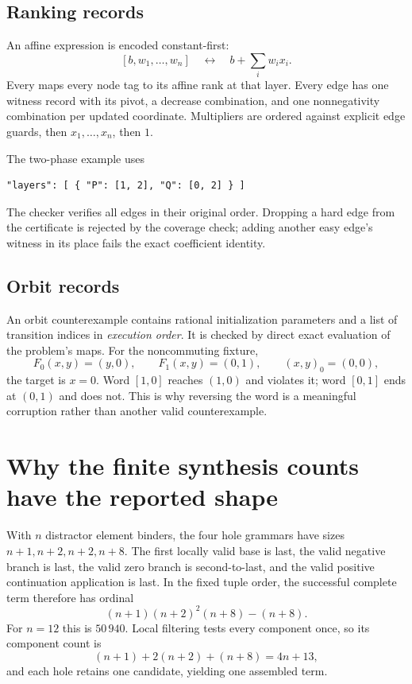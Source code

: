 \subsection{Ranking records}

An affine expression is encoded constant-first:
\[
 [b,w_1,\ldots,w_n]\quad\longleftrightarrow\quad b+\sum_iw_ix_i.
\]
Every  maps every node tag to its affine rank at that layer.
Every edge has one witness record with its pivot, a decrease combination, and
one nonnegativity combination per updated coordinate. Multipliers are ordered
against explicit edge guards, then $x_1,\ldots,x_n$, then $1$.

The two-phase example uses
\begin{lstlisting}
"layers": [ { "P": [1, 2], "Q": [0, 2] } ]
\end{lstlisting}
The checker verifies all edges in their original order. Dropping a hard edge
from the certificate is rejected by the coverage check; adding another easy
edge's witness in its place fails the exact coefficient identity.

\subsection{Orbit records}

An orbit counterexample contains rational initialization parameters and a list
of transition indices in \emph{execution order}. It is checked by direct exact
evaluation of the problem's maps. For the noncommuting fixture,
\[
 F_0(x,y)=(y,0),\qquad F_1(x,y)=(0,1),\qquad (x,y)_0=(0,0),
\]
the target is $x=0$. Word $[1,0]$ reaches $(1,0)$ and violates it; word $[0,1]$
ends at $(0,1)$ and does not. This is why reversing the word is a meaningful
corruption rather than another valid counterexample.

\section{Why the finite synthesis counts have the reported shape}

With $n$ distractor element binders, the four hole grammars have sizes
$n+1,n+2,n+2,n+8$. The first locally valid base is last, the valid negative
branch is last, the valid zero branch is second-to-last, and the valid positive
continuation application is last. In the fixed tuple order, the successful
complete term therefore has ordinal
\[
 (n+1)(n+2)^2(n+8)-(n+8).
\]
For $n=12$ this is $50\,940$. Local filtering tests every component once, so its
component count is
\[
 (n+1)+2(n+2)+(n+8)=4n+13,
\]
and each hole retains one candidate, yielding one assembled term.

